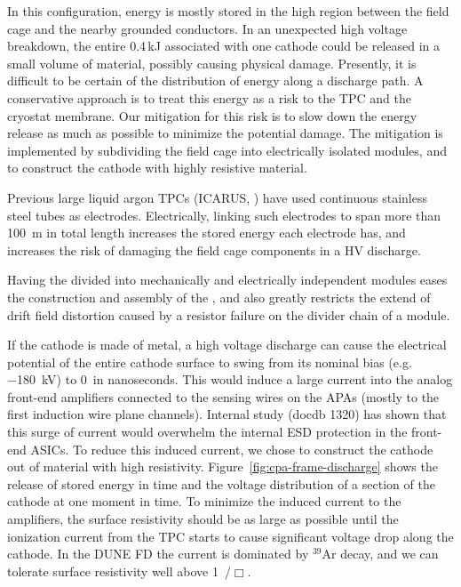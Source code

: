 In this configuration, energy is mostly stored in the high \efield{} region between the field cage and the nearby grounded conductors.  In an unexpected high voltage breakdown, the entire 0.4\,kJ associated with one cathode could be released in a small volume of material, possibly causing physical damage.
Presently, it is difficult to be certain of the distribution of energy along a discharge path. A conservative approach is to treat this energy as a risk to the TPC and the cryostat membrane.  
Our mitigation for this risk is to slow down the energy release as much as possible to minimize the potential damage.  The mitigation is implemented by subdividing the field cage into electrically isolated modules, and to construct the cathode with highly resistive material.


Previous large liquid argon TPCs (ICARUS, \microboone) have used continuous stainless steel tubes as electrodes. 
Electrically, linking such electrodes to span more than \SI{100}{\m} in total length increases the stored energy each electrode has, and increases the risk of damaging the field cage components in a HV discharge. 

Having the  divided into mechanically and electrically independent modules eases the construction and assembly of the , and also greatly restricts the extend of drift field distortion caused by a resistor failure on the divider chain of a  module.

If the cathode is made of metal, a high voltage discharge can cause the electrical potential of the entire cathode surface to swing from its nominal bias (e.g. \SI{-180}{kV}) to 0\, in nanoseconds. This would induce a large current into the analog front-end amplifiers connected to the sensing wires on the APAs (mostly to the first induction wire plane channels). Internal study (docdb 1320) has shown that this surge of current would overwhelm the internal ESD protection in the front-end ASICs.  To reduce this induced current, we chose to construct the cathode out of material with high resistivity.  Figure~\ref{fig:cpa-frame-discharge} shows the release of stored energy in time and the voltage distribution of a section of the cathode at one moment in time.  To minimize the induced current to the amplifiers, the surface resistivity should be as large as possible until the ionization current from the TPC starts to cause significant voltage drop along the cathode.  In the DUNE FD the current is dominated by $^{39}$Ar decay, and we can tolerate surface resistivity well above \SI{1}{\giga\ohm/$\Box$}. 


